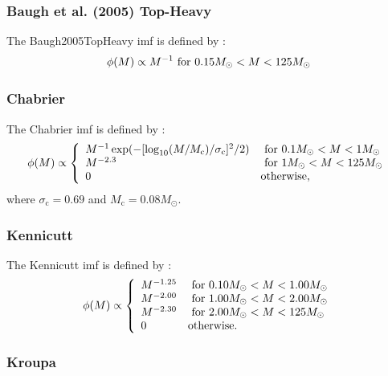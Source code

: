 \subsubsection{Baugh et al. (2005) Top-Heavy}

The {\normalfont \ttfamily Baugh2005TopHeavy} \gls{imf} is defined by \citep{baugh_can_2005}:
\begin{equation}
 \phi(M) \propto 
 M^{-1} \hbox{ for } 0.15M_\odot < M < 125M_\odot
\end{equation}

\subsubsection{Chabrier}

The {\normalfont \ttfamily Chabrier} \gls{imf} is defined by \citep{chabrier_galactic_2001}:
\begin{equation}
 \phi(M) \propto \left\{ \begin{array}{ll}
 M^{-1} \exp(-[\log_{10}(M/M_{\mathrm c})/\sigma_{\mathrm c}]^2/2) & \hbox{ for } 0.1M_\odot < M < 1M_\odot \\
 M^{-2.3} & \hbox{ for } 1M_\odot < M < 125M_\odot \\
 0 & \hbox {otherwise,} \end{array} \right.
\end{equation}
where $\sigma_{\mathrm c}=0.69$ and $M_{\mathrm c}=0.08M_\odot$.

\subsubsection{Kennicutt}

The {\normalfont \ttfamily Kennicutt} \gls{imf} is defined by \citep{kennicutt_rate_1983}:
\begin{equation}
 \phi(M) \propto \left\{ \begin{array}{ll}
 M^{-1.25} & \hbox{ for } 0.10M_\odot < M < 1.00M_\odot \\
 M^{-2.00} & \hbox{ for } 1.00M_\odot < M < 2.00M_\odot \\
 M^{-2.30} & \hbox{ for } 2.00M_\odot < M < 125M_\odot \\
 0 & \hbox {otherwise.} \end{array} \right.
\end{equation}

\subsubsection{Kroupa}

